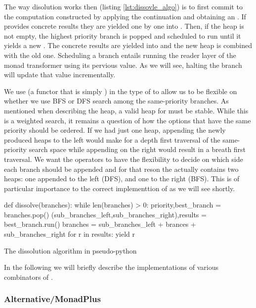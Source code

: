 The way disolution works then (listing \ref{lst:dissovle_algo}) is to first
commit to the computation constructed by applying the continuation and
obtaining an . If  provides concrete results they are
yielded one by one into . Then, if the heap is not empty, the
highest priority branch is popped and scheduled to run until it yields
a new . The concrete results are yielded into  and the
new heap is combined with the old one. Scheduling a branch entails
running the reader layer of the monad transformer using its pervious
value. As we will see, halting the branch will update that value
incrementally.

We use  (a functor that is simply ) in the type of  to allow us to be flexible on whether
we use BFS or DFS search among the same-priority branches. As
mentioned when describing the heap, a valid heap for  must
be stable. While this is a weighted search, it remains a question of
how the options that have the same priority should be ordered. If we
had just one heap, appending the newly produced heaps to the left
would make for a depth first traversal of the same-priority search
space while appending on the right would result in a breath first
traversal. We want the operators to have the flexibility to decide on
which side each branch should be appended and for that reson the
 actually contains two heaps: one appended to the left
(DFS), and one to the right (BFS). This is of particular importance to
the correct implementtion of \hask{<//>} as we will see shortly.

\begin{code}
\begin{pycode}
def dissolve(branches):
    while len(branches) > 0:
        priority,best_branch = branches.pop()
        (sub_branches_left,sub_branches_right),results = best_branch.run()
        branches = sub_branches_left + brances + sub_branches_right
        for r in results:
            yield r
\end{pycode}
  \caption{\label{lst:dissovle_algo}The dissolution algorithm in
    pseudo-python}
\end{code}


In the following we will briefly describe the implementations of
various combinators of .

\subsubsection{Alternative/MonadPlus}

